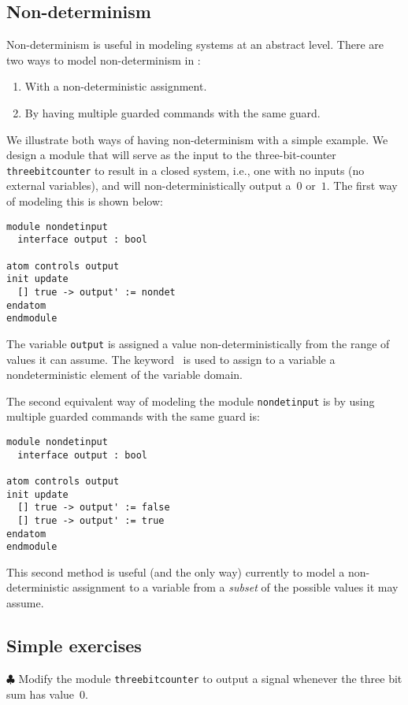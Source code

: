 \subsection{Non-determinism}
Non-determinism is useful in modeling systems at an abstract
level. There are two ways to model non-determinism in \rem:
\begin{enumerate}
\item With a non-deterministic assignment. 
\item By having multiple guarded commands with the same guard. 
\end{enumerate}

We illustrate both ways of having non-determinism with a simple
example. We design a module that will serve as the input to the
three-bit-counter {\tt threebitcounter} to result in a closed system,
i.e., one with no inputs (no external variables), and will
non-deterministically output a~$0$ or~$1$. The first way of modeling
this is shown below:

\begin{verbatim}
module nondetinput
  interface output : bool

atom controls output
init update
  [] true -> output' := nondet
endatom 
endmodule 
\end{verbatim}

The variable {\tt output} is assigned a value non-deterministically from the
range of values it can assume. 
The keyword \NONDET\ is used to assign to a variable a
nondeterministic element of the variable domain.

The second equivalent way of modeling the module {\tt nondetinput} is by using multiple
guarded commands with the same guard is:

\begin{verbatim}
module nondetinput
  interface output : bool

atom controls output
init update
  [] true -> output' := false
  [] true -> output' := true
endatom 
endmodule 
\end{verbatim}

This second method is useful (and the only way) currently to model a
non-deterministic assignment to a variable from a {\em subset} of the
possible values it may assume. 

\subsection{Simple exercises}
$\clubsuit$ Modify the module {\tt threebitcounter} to output a signal
whenever the three bit sum has value~$0$. 

